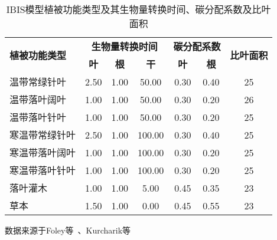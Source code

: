 \begin{table}
    \centering
    \caption{IBIS模型植被功能类型及其生物量转换时间、碳分配系数及比叶面积}
    \label{tab:IBIB-PFT}
    \begin{threeparttable}
        \begin{tabular}{lcccccc}
            \toprule 
            \multirow{2}{*}{\textbf{植被功能类型}} & \multicolumn{3}{c}{\textbf{生物量转换时间}} & \multicolumn{2}{c}{\textbf{碳分配系数}} & \multirow{2}{*}{\textbf{比叶面积}} \\ 
            \cmidrule(lr){2-4} \cmidrule(lr){5-6}
            & \textbf{叶} & \textbf{根} & \textbf{干} & \textbf{叶} & \textbf{根} &  \\ 
            \midrule
            温带常绿针叶&    2.50 & 1.00 & 50.00 & 0.30 & 0.40 & 25 \\ 
            温带落叶阔叶&    1.00 & 1.00 & 50.00 & 0.30 & 0.20 & 26 \\ 
            温带落叶针叶&    1.00 & 1.00 & 50.00 & 0.30 & 0.20 & 25 \\ 
            寒温带常绿针叶&  2.50 & 1.00 & 100.00 &0.30  & 0.40 &25  \\ 
            寒温带落叶阔叶&  1.00 & 1.00 & 100.00 &0.30  & 0.20 &25  \\ 
            寒温带落叶针叶&  1.00 & 1.00 & 100.00 &0.30  & 0.20 &25  \\ 
            落叶灌木&        1.00 & 1.00 & 5.00 & 0.45 &0.35  &  23\\ 
            草本&           1.50 & 1.00 & 0.00 &  0.45& 0.55 & 23 \\ 
            \bottomrule
        \end{tabular}
        \begin{tablenotes}
            \footnotesize
            \item[]数据来源于Foley等~\cite{foley1996integrated}、Kurcharik等~\cite{kucharik2000testing}
          \end{tablenotes}
    \end{threeparttable}
\end{table}


